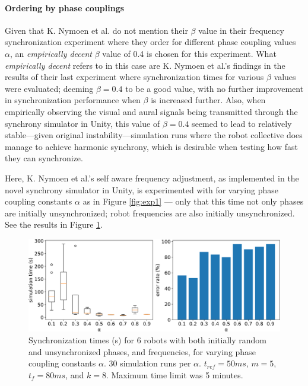 		\paragraph{Ordering by phase couplings}
		
		Given that K. Nymoen et al. do not mention their $\beta$ value in their frequency synchronization experiment where they order for different phase coupling values $\alpha$, an \textit{empirically decent} $\beta$ value of 0.4 is chosen for this experiment. What \textit{empirically decent} refers to in this case are K. Nymoen et al.'s findings in the results of their last experiment \cite{nymoen_synch} where synchronization times for various $\beta$ values were evaluated; deeming $\beta=0.4$ to be a good value, with no further improvement in synchronization performance when $\beta$ is increased further. Also, when empirically observing the visual and aural signals being transmitted through the synchrony simulator in Unity, this value of $\beta=0.4$ seemed to lead to relatively stable—given original instability—simulation runs where the robot collective does manage to achieve harmonic synchrony, which is desirable when testing how fast they can synchronize.
		
		Here, K. Nymoen et al.'s self aware frequency adjustment, as implemented in the novel synchrony simulator in Unity, is experimented with for varying phase coupling constants $\alpha$ as in Figure \ref{fig:exp1} — only that this time not only phases are initially unsynchronized; robot frequencies are also initially unsynchronized. See the results in Figure \ref{fig:exp2}.
		
		\begin{figure}[ht!]
			\centering
			\includegraphics[width=\linewidth]{Assets/DocSegments/Chapters/ExperimentsAndResults/Figures/PerfScores/experiment2_perfScores.pdf}
			\caption{Synchronization times (s) for 6 robots with both initially random and unsynchronized phases, and frequencies, for varying phase coupling constants $\alpha$. 30 simulation runs per $\alpha$. $t_{ref}=50ms$, $m=5$, $t_f=80ms$, and $k=8$. Maximum time limit was 5 minutes.}
			\label{fig:exp2}
		\end{figure}
	

